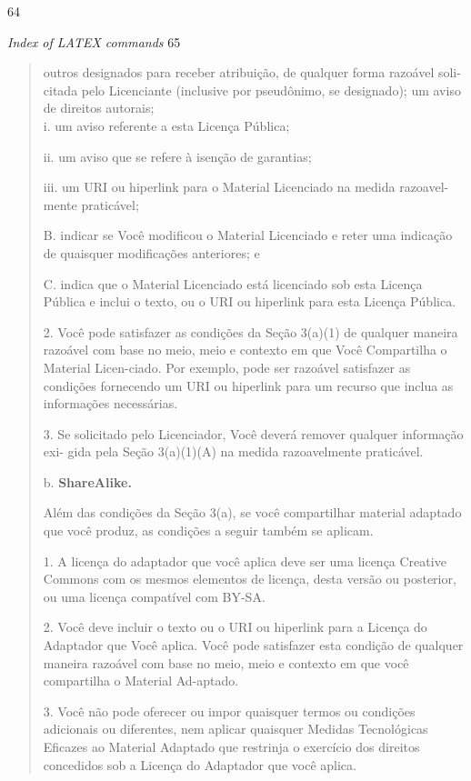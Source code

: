 \documentclass[
]{article}
\begin{document}
64

\emph{Index of LATEX commands} 65

\begin{quote}
outros designados para receber atribuição, de qualquer forma razoável
soli-citada pelo Licenciante (inclusive por pseudônimo, se designado);
um aviso de direitos autorais;\\
i. um aviso referente a esta Licença Pública;

ii. um aviso que se refere à isenção de garantias;

iii. um URI ou hiperlink para o Material Licenciado na medida razoavel-
mente praticável;

B. indicar se Você modificou o Material Licenciado e reter uma indicação
de quaisquer modificações anteriores; e

C. indica que o Material Licenciado está licenciado sob esta Licença
Pública e inclui o texto, ou o URI ou hiperlink para esta Licença
Pública.

2. Você pode satisfazer as condições da Seção 3(a)(1) de qualquer
maneira razoável com base no meio, meio e contexto em que Você
Compartilha o Material Licen-ciado. Por exemplo, pode ser razoável
satisfazer as condições fornecendo um URI ou hiperlink para um recurso
que inclua as informações necessárias.

3. Se solicitado pelo Licenciador, Você deverá remover qualquer
informação exi- gida pela Seção 3(a)(1)(A) na medida razoavelmente
praticável.

b. \textbf{ShareAlike.}

Além das condições da Seção 3(a), se você compartilhar material adaptado
que você produz, as condições a seguir também se aplicam.

1. A licença do adaptador que você aplica deve ser uma licença Creative
Commons com os mesmos elementos de licença, desta versão ou posterior,
ou uma licença compatível com BY-SA.

2. Você deve incluir o texto ou o URI ou hiperlink para a Licença do
Adaptador que Você aplica. Você pode satisfazer esta condição de
qualquer maneira razoável com base no meio, meio e contexto em que você
compartilha o Material Ad-aptado.

3. Você não pode oferecer ou impor quaisquer termos ou condições
adicionais ou diferentes, nem aplicar quaisquer Medidas Tecnológicas
Eficazes ao Material Adaptado que restrinja o exercício dos direitos
concedidos sob a Licença do Adaptador que você aplica.
\end{quote}
\end{document}
